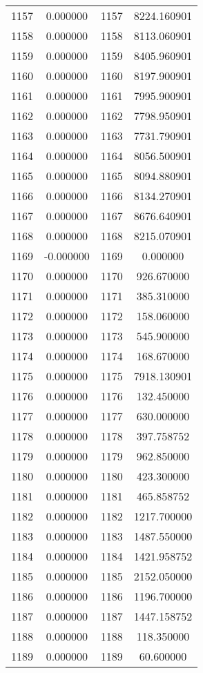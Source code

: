 \documentclass[12pt]{article}
\begin{document}
\begin{longtable}{@{}cccc@{}}
1157 & 0.000000 & 1157 & 8224.160901 \\
1158 & 0.000000 & 1158 & 8113.060901 \\
1159 & 0.000000 & 1159 & 8405.960901 \\
1160 & 0.000000 & 1160 & 8197.900901 \\
1161 & 0.000000 & 1161 & 7995.900901 \\
1162 & 0.000000 & 1162 & 7798.950901 \\
1163 & 0.000000 & 1163 & 7731.790901 \\
1164 & 0.000000 & 1164 & 8056.500901 \\
1165 & 0.000000 & 1165 & 8094.880901 \\
1166 & 0.000000 & 1166 & 8134.270901 \\
1167 & 0.000000 & 1167 & 8676.640901 \\
1168 & 0.000000 & 1168 & 8215.070901 \\
1169 & -0.000000 & 1169 & 0.000000 \\
1170 & 0.000000 & 1170 & 926.670000 \\
1171 & 0.000000 & 1171 & 385.310000 \\
1172 & 0.000000 & 1172 & 158.060000 \\
1173 & 0.000000 & 1173 & 545.900000 \\
1174 & 0.000000 & 1174 & 168.670000 \\
1175 & 0.000000 & 1175 & 7918.130901 \\
1176 & 0.000000 & 1176 & 132.450000 \\
1177 & 0.000000 & 1177 & 630.000000 \\
1178 & 0.000000 & 1178 & 397.758752 \\
1179 & 0.000000 & 1179 & 962.850000 \\
1180 & 0.000000 & 1180 & 423.300000 \\
1181 & 0.000000 & 1181 & 465.858752 \\
1182 & 0.000000 & 1182 & 1217.700000 \\
1183 & 0.000000 & 1183 & 1487.550000 \\
1184 & 0.000000 & 1184 & 1421.958752 \\
1185 & 0.000000 & 1185 & 2152.050000 \\
1186 & 0.000000 & 1186 & 1196.700000 \\
1187 & 0.000000 & 1187 & 1447.158752 \\
1188 & 0.000000 & 1188 & 118.350000 \\
1189 & 0.000000 & 1189 & 60.600000 \\

\end{longtable}
\end{document}
